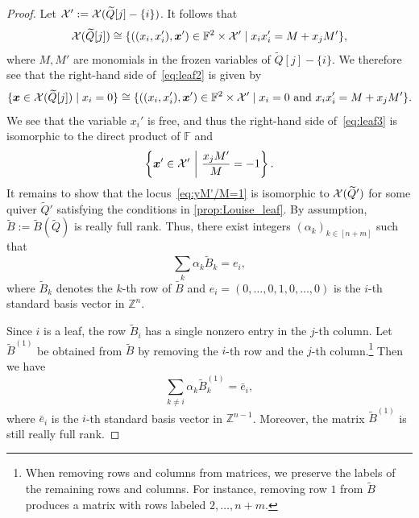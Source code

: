 \documentclass[11pt]{article}
\theoremstyle{definition}
\numberwithin{equation}{section}
\newcommand\Z{\mathbb{Z}}
\newcommand\bx{{\bm{x}}}
\newcommand\Qice{\widetilde{Q}}
\newcommand\BQice{\widetilde{B}(\Qice)}
\newcommand\F{\mathbb{F}}
\def\Qicefr[#1]{\Qice[#1]}
\newcommand\Bice{\widetilde{B}}
\newcommand\bice{\tilde{B}}
\newcommand\Ga{\F}
\newcommand\pA{^{(1)}}
\begin{document}
\begin{proof}
Let $\Xcal':=\Xcal(\Qicefr[j] - \{i\})$.  It follows that 
\begin{equation}\label{eq:leaf2.5}
  \Xcal(\Qicefr[j])\cong \{\left((x_i,x_i'),\bx'\right)\in\Ga^2\times\Xcal'\mid x_ix_i'=M+x_jM'\},
\end{equation}
where $M,M'$ are monomials in the frozen variables of $\Qicefr[j] - \{i\}$. We therefore see that the right-hand side of~\eqref{eq:leaf2} is given by 
\begin{equation}\label{eq:leaf3}
  \{\bx\in\Xcal(\Qicefr[j])\mid x_i=0\}
\cong \{\left((x_i,x_i'),\bx'\right)\in\Ga^2\times\Xcal'\mid x_i=0 \text{ and } x_ix_i'=M+x_jM'\}.
\end{equation}
We see that the variable $x_i'$ is free, and thus the right-hand side of~\eqref{eq:leaf3} is isomorphic to the direct product of $\Ga$ and 
\begin{equation} \label{eq:yM'/M=1} 
\left\{\bx'\in \Xcal'\ \middle|\  \frac{x_jM'}{M}=-1\right\}.
\end{equation}
%
%
%
%
%
%
%
%
%
%
%
%
%
%
%
  It remains to show that the locus~\eqref{eq:yM'/M=1} is isomorphic to $\Xcal(\Qice')$ for some quiver $\Qice'$ satisfying the conditions in \cref{prop:Louise_leaf}. By assumption, $\Bice:=\BQice$ is really full rank. Thus, there exist integers $(\alpha_k)_{k\in[n+m]}$ such that 
  \begin{equation*}%
    \sum_{k} \alpha_k \bice_k=e_i,
  \end{equation*}
where $\bice_k$ denotes the $k$-th row of $\Bice$ and $e_i=(0,\dots,0,1,0,\dots,0)$ is the $i$-th standard basis vector in $\Z^n$. 

%
Since $i$ is a leaf, the row $\bice_i$ has a single nonzero entry in the $j$-th column. Let $\Bice\pA$ be obtained from $\Bice$ by removing the $i$-th row and the $j$-th column.\footnote{When removing rows and columns from matrices, we preserve the labels of the remaining rows and columns. For instance, removing row $1$ from $\Bice$ produces a matrix with rows labeled $2,\dots,n+m$.} Then we have
  \begin{equation*}%
    \sum_{k\neq i} \alpha_k \bice\pA_k=\bar e_i,
  \end{equation*}
where $\bar e_i$ is the $i$-th standard basis vector in $\Z^{n-1}$. Moreover, the matrix $\Bice\pA$ is still really full rank.
%
%
%
%
%


\end{proof}
\end{document}
